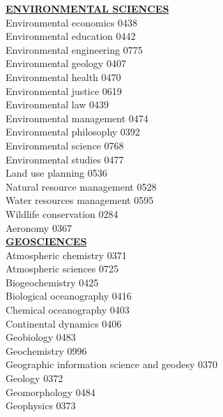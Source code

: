 \documentclass[9pt]{article}
\newcommand{\categoryheading}[1]{{\fontsize{8}{11}\selectfont \textbf{\uline{#1}}}}
\begin{document}
\begin{multicols}{3}
\categoryheading{ENVIRONMENTAL SCIENCES} \leavevmode \\
Environmental economics \hfill 0438 \leavevmode \\
Environmental education \hfill 0442 \leavevmode \\
Environmental engineering \hfill 0775 \leavevmode \\
Environmental geology \hfill 0407 \leavevmode \\
Environmental health \hfill 0470 \leavevmode \\
Environmental justice \hfill 0619 \leavevmode \\
Environmental law \hfill 0439 \leavevmode \\
Environmental management \hfill 0474 \leavevmode \\
Environmental philosophy \hfill 0392 \leavevmode \\
Environmental science \hfill 0768 \leavevmode \\
Environmental studies \hfill 0477 \leavevmode \\
Land use planning \hfill 0536 \leavevmode \\
Natural resource management \hfill 0528 \leavevmode \\
Water resources management \hfill 0595 \leavevmode \\
Wildlife conservation \hfill 0284 \leavevmode \\
Aeronomy \hfill 0367 \leavevmode \\
\columnbreak
\categoryheading{GEOSCIENCES} \leavevmode \\
Atmospheric chemistry \hfill 0371 \leavevmode \\
Atmospheric sciences \hfill 0725 \leavevmode \\
Biogeochemistry \hfill 0425 \leavevmode \\
Biological oceanography \hfill 0416 \leavevmode \\
Chemical oceanography \hfill 0403 \leavevmode \\
Continental dynamics \hfill 0406 \leavevmode \\
Geobiology \hfill 0483 \leavevmode \\
Geochemistry \hfill 0996 \leavevmode \\
Geographic information science
and geodesy \hfill 0370 \leavevmode \\
Geology \hfill 0372 \leavevmode \\
Geomorphology \hfill 0484 \leavevmode \\
Geophysics \hfill 0373 \leavevmode \\

\end{multicols}
\end{document}
